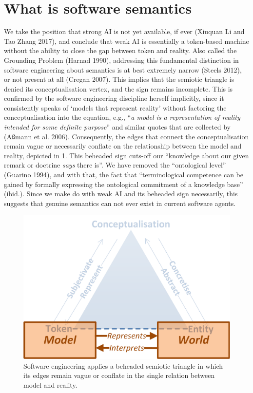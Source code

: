 \documentclass[a4paper,11pt,oneside,oldfontcommands]{memoir}
\theoremstyle{definition}
\theoremstyle{break}		%
\numberwithin{equation}{chapter}
\numberwithin{figure}{chapter}
\begin{document}
\hypertarget{what-is-software-semantics}{%
\section{What is software semantics}\label{what-is-software-semantics}}

We take the position that strong AI is not yet available, if ever
(Xiuquan Li and Tao Zhang 2017), and conclude that weak AI is
essentially a token-based machine without the ability to close the gap
between token and reality. Also called the Grounding Problem (Harnad
1990), addressing this fundamental distinction in software engineering
about semantics is at best extremely narrow (Steels 2012), or not
present at all (Cregan 2007). This implies that the semiotic triangle is
denied its conceptualisation vertex, and the sign remains incomplete.
This is confirmed by the software engineering discipline herself
implicitly, since it consistently speaks of `models that represent
reality' without factoring the conceptualisation into the equation,
e.g., ``\emph{a model is a representation of reality intended for some
definite purpose}'' and similar quotes that are collected by (Aßmann et
al. 2006). Consequently, the edges that connect the conceptualisation
remain vague or necessarily conflate on the relationship between the
model and reality, depicted in \cref{fig:software-models-reality}. This
beheaded sign cuts-off our ``knowledge about our given remark or
doctrine \emph{says} there is''. We have removed the ``ontological
level'' (Guarino 1994), and with that, the fact that ``terminological
competence can be gained by formally expressing the ontological
commitment of a knowledge base'' (ibid.). Since we make do with weak AI
and its beheaded sign necessarily, this suggests that genuine semantics
can not ever exist in current software agents.

\begin{figure}
\hypertarget{fig:software-models-reality}{%
\centering
\includegraphics{./tex2pdf.9980/a8961801a1f02a208deeb0559c89c4f1e2bb6725.png}
\caption{Software engineering applies a beheaded semiotic triangle in
which its edges remain vague or conflate in the single relation between
model and reality.}\label{fig:software-models-reality}
}
\end{figure}
\end{document}
